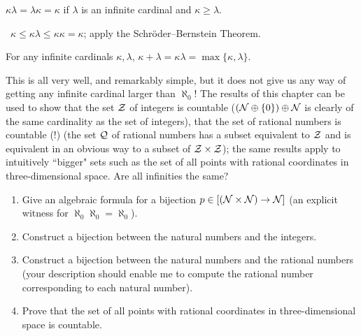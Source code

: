 \begin{thm}
 $\kappa\lambda = \lambda\kappa = \kappa$ if $\lambda$ is an
 infinite cardinal and $\kappa
 \geq \lambda$.
\end{thm}

\preuve\ $\kappa \leq \kappa\lambda \leq \kappa\kappa = \kappa$; apply the
Schr\"oder--Bernstein Theorem.\linebreak
\mbox{}\finpreuve

\begin{cor}
 For any infinite cardinals $\kappa,\lambda$,
 $\kappa + \lambda = \kappa\lambda = \max\{\kappa,\lambda\}$.
\end{cor}

This is all very well, and remarkably simple, but it does not
give us any way of getting any infinite cardinal larger
than $\aleph_0$!  The results of this chapter can be used to show that
the set ${\cal Z}$ of integers is countable ($({\cal N} \oplus
\{0\}) \oplus {\cal N}$ is clearly of the same cardinality as the set of
integers), that the set of rational numbers is
countable (!) (the set ${\cal Q}$ of rational numbers has a subset
equivalent to ${\cal Z}$ and is equivalent
in an obvious way to a subset of ${\cal Z} \times
{\cal Z}$); the same results apply to intuitively ``bigger" sets such as the
set of all points with rational coordinates in three-dimensional
space.  Are all infinities the same?

\Exercises

\begin{enumerate}
\item  Give an algebraic formula for a bijection $p \in
  [({\cal N} \times {\cal N}) \rightarrow {\cal N}]$ (an explicit witness for
  $\aleph_0\aleph_0 = \aleph_0$).

\item  Construct a bijection between the natural numbers
  and the integers.

\item  Construct a bijection between the natural numbers and the
  rational numbers (your description should enable me
  to compute the rational number corresponding to each natural number).

\item  Prove that the set of all points with rational coordinates in
  three-dimensional space is countable.
\end{enumerate}
